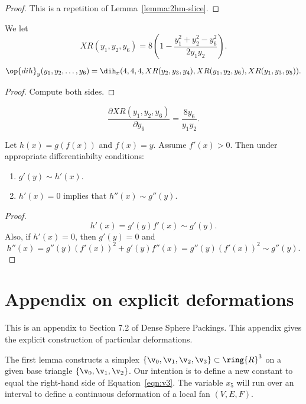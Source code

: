\begin{proof}  This is a repetition of Lemma~\ref{lemma:2hm-slice}.
\end{proof}

\begin{definition}[$XR$]
We let
\[
XR(y_1,y_2,y_6) = 8 (1 - \frac{y_1^2 + y_2^2 - y_6^2}{2 y_1 y_2}).
\]
\end{definition}

\begin{lemma}[]
\[
\op{dih}_y(y_1,y_2,\ldots,y_6) = \dih_x(4,4,4,XR(y_2,y_3,y_4),XR(y_1,y_2,y_6),XR(y_1,y_3,y_5)).
\]
\end{lemma}

\begin{proof}
Compute both sides.
\end{proof}

\begin{lemma}[]
\[
\frac{\partial XR(y_1,y_2,y_6)}{\partial y_6} = \frac{8 y_6}{y_1 y_2}.
\]
\end{lemma}

\begin{lemma}[]
Let $h(x) = g(f(x))$ and $f(x)= y$.  Assume $f'(x)>0$.  Then under appropriate differentiabilty conditions:
\begin{enumerate}
\item $g'(y) \sim h'(x)$.
\item $h'(x) = 0$ implies that $h''(x)\sim g''(y)$.
\end{enumerate}
\end{lemma}

\begin{proof}
\[
h'(x) = g'(y) f'(x) \sim g'(y).
\]
Also, if $h'(x) = 0$, then $g'(y)=0$ and
\[
h''(x) = g''(y) (f'(x))^2 + g'(y) f''(x) = g''(y) (f'(x))^2 \sim g''(y).
\]
\end{proof}


\newpage
\section{Appendix on explicit deformations}\label{sec:sup-deformation}

This is an appendix to Section 7.2 of Dense Sphere Packings.
This appendix gives the explicit construction of particular deformations.

The first lemma constructs a simplex $\{\v_0,\v_1,\v_2,\v_3\}\subset\ring{R}^3$ on
a given base triangle $\{\v_0,\v_1,\v_2\}$.  Our intention is to define a new constant
to equal the right-hand side of Equation~\ref{eqn:v3}.  The variable $x_5$ will run over
an interval to define a continuous deformation of a local fan $(V,E,F)$.



